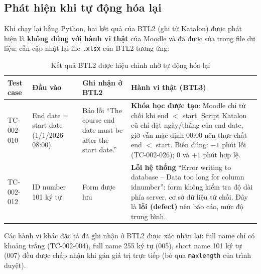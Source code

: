 \subsection{Phát hiện khi tự động hóa lại}\label{sec:f002-findings}
Khi chạy lại bằng Python, hai kết quả của BTL2 (ghi từ Katalon) được phát hiện là \textbf{không đúng với hành vi thật} của Moodle
và đã được sửa trong file dữ liệu; cần cập nhật lại file \texttt{.xlsx} của BTL2 tương ứng:
\begin{table}[H]
\centering\footnotesize
\begin{tabular}{|l|L{3.4cm}|L{4.0cm}|L{5.2cm}|}
\hline
{}\textbf{Test case} & \textbf{Đầu vào} & \textbf{Ghi nhận ở BTL2} & \textbf{Hành vi thật (BTL3)} \\ \hline
TC-002-010 & End date = start date (1/1/2026 08:00) & Báo lỗi ``The course end date must be after the start date.'' &
  \textbf{Khóa học được tạo}: Moodle chỉ từ chối khi end $<$ start. Script Katalon cũ chỉ đặt ngày/tháng của end date, giờ vẫn
  mặc định 00:00 nên thực chất end $<$ start. Biên đúng: $-1$ phút lỗi (TC-002-026); $0$ và $+1$ phút hợp lệ. \\ \hline
TC-002-012 & ID number 101 ký tự & Form được lưu & \textbf{Lỗi hệ thống} ``Error writing to database -- Data too long for column idnumber'':
  form không kiểm tra độ dài phía server, cơ sở dữ liệu từ chối. Đây là \textbf{lỗi (defect)} nên báo cáo, mức độ trung bình. \\ \hline
\end{tabular}
\caption{Kết quả BTL2 được hiệu chỉnh nhờ tự động hóa lại}
\end{table}
Các hành vi khác đặc tả đã ghi nhận ở BTL2 được xác nhận lại: full name chỉ có khoảng trắng (TC-002-004), full name 255 ký tự (005),
short name 101 ký tự (007) đều được chấp nhận khi gán giá trị trực tiếp (bỏ qua \texttt{maxlength} của trình duyệt).
